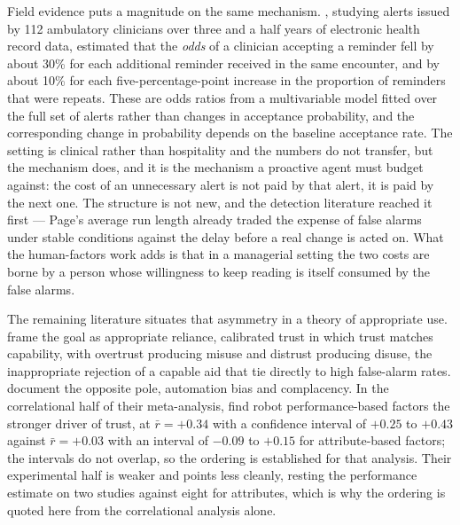 Field evidence puts a magnitude on the same mechanism.
\citet{ancker_effects_2017}, studying alerts issued by 112 ambulatory clinicians
over three and a half years of electronic health record data, estimated that the
\emph{odds} of a clinician accepting a reminder fell by about 30\% for each
additional reminder received in the same encounter, and by about 10\% for each
five-percentage-point increase in the proportion of reminders that were
repeats. These are odds ratios from a multivariable model fitted over the full
set of alerts rather than changes in acceptance probability, and the
corresponding change in probability depends on the baseline acceptance rate.
The setting is clinical rather than hospitality and the numbers do not transfer,
but the mechanism does, and it is the mechanism a proactive agent must budget
against: the cost of an unnecessary alert is not paid by that alert, it is paid
by the next one. The structure is not new, and the detection literature reached
it first --- Page's average run length \citep{page_continuous_1954} already
traded the expense of false alarms under stable conditions against the delay
before a real change is acted on. What the human-factors work adds is that in a
managerial setting the two costs are borne by a person whose willingness to
keep reading is itself consumed by the false alarms.

The remaining literature situates that asymmetry in a theory of appropriate
use. \citet{lee_trust_2004} frame the goal as appropriate reliance, calibrated
trust in which trust matches capability, with overtrust producing misuse and
distrust producing disuse, the inappropriate rejection of a capable aid that
\citet{parasuraman_humans_1997} tie directly to high false-alarm rates.
\citet{parasuraman_complacency_2010} document the opposite pole, automation
bias and complacency. In the correlational half of their meta-analysis,
\citet{hancock_meta-analysis_2011} find robot performance-based factors the
stronger driver of trust, at $\bar{r} = +0.34$ with a confidence interval of
$+0.25$ to $+0.43$ against $\bar{r} = +0.03$ with an interval of $-0.09$ to
$+0.15$ for attribute-based factors; the intervals do not overlap, so the
ordering is established for that analysis. Their experimental half is weaker
and points less cleanly, resting the performance estimate on two studies
against eight for attributes, which is why the ordering is quoted here from the
correlational analysis alone.

